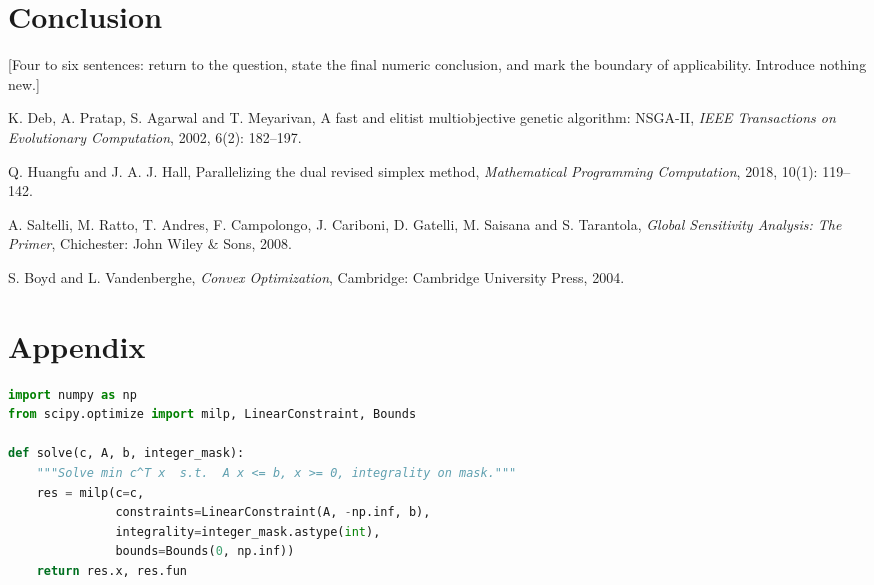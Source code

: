 \documentclass{swmcmthesis}
\begin{document}
\section{Conclusion}
[Four to six sentences: return to the question, state the final numeric
conclusion, and mark the boundary of applicability. Introduce nothing new.]

\begin{thebibliography}{9}
K. Deb, A. Pratap, S. Agarwal and T. Meyarivan, A fast and elitist
multiobjective genetic algorithm: NSGA-II, \textit{IEEE Transactions on
Evolutionary Computation}, 2002, 6(2): 182--197.

Q. Huangfu and J. A. J. Hall, Parallelizing the dual revised simplex method,
\textit{Mathematical Programming Computation}, 2018, 10(1): 119--142.

A. Saltelli, M. Ratto, T. Andres, F. Campolongo, J. Cariboni, D. Gatelli,
M. Saisana and S. Tarantola, \textit{Global Sensitivity Analysis: The Primer},
Chichester: John Wiley \& Sons, 2008.

S. Boyd and L. Vandenberghe, \textit{Convex Optimization}, Cambridge: Cambridge
University Press, 2004.
\end{thebibliography}

\newpage
\section*{Appendix}


\begin{lstlisting}[language=Python,caption={Solver core (excerpt).}]
import numpy as np
from scipy.optimize import milp, LinearConstraint, Bounds

def solve(c, A, b, integer_mask):
    """Solve min c^T x  s.t.  A x <= b, x >= 0, integrality on mask."""
    res = milp(c=c,
               constraints=LinearConstraint(A, -np.inf, b),
               integrality=integer_mask.astype(int),
               bounds=Bounds(0, np.inf))
    return res.x, res.fun
\end{lstlisting}
\end{document}
